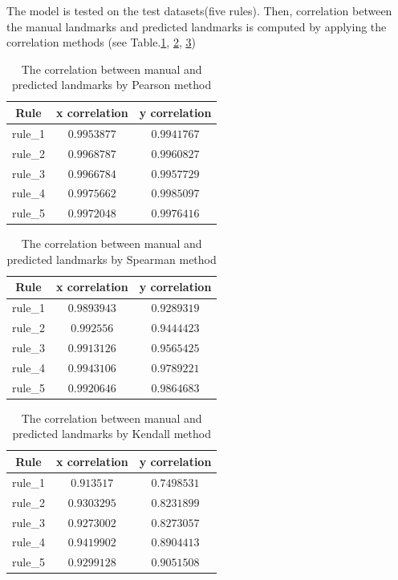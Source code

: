 The model is tested on the test datasets(five rules). Then, correlation between the manual landmarks and predicted landmarks is computed by applying the correlation methods (see Table.\ref{pearson}, \ref{spearman}, \ref{kendall})
\begin{table}[h!]
	\centering
	\begin{tabular}{c c c}
		Rule & x correlation & y correlation \\ \hline
		rule\_1 & $0.9953877$ & $0.9941767$ \\ \hline
		rule\_2 & $0.9968787$ & $0.9960827$ \\ \hline
		rule\_3 & $0.9966784$ & $0.9957729$ \\ \hline
		rule\_4 & $0.9975662$ & $0.9985097$ \\ \hline
		rule\_5 & $0.9972048$ & $0.9976416$ \\ \hline
	\end{tabular}
	\caption{The correlation between manual and predicted landmarks by Pearson\cite{pallant2013spss} method}
	\label{pearson}
\end{table}
\begin{table}[h!]
	\centering
	\begin{tabular}{c c c}
		Rule & x correlation & y correlation \\ \hline
		rule\_1 & $0.9893943$ & $0.9289319$ \\ \hline
		rule\_2 & $0.992556$ & $0.9444423$ \\ \hline
		rule\_3 & $0.9913126$ & $0.9565425$ \\ \hline
		rule\_4 & $0.9943106$ & $0.9789221$ \\ \hline
		rule\_5 & $0.9920646$ & $0.9864683$ \\ \hline
	\end{tabular}
	\caption{The correlation between manual and predicted landmarks by Spearman\cite{myers2010research} method}
	\label{spearman}
\end{table}
\begin{table}[h!]
	\centering
	\begin{tabular}{c c c}
		Rule & x correlation & y correlation \\ \hline
		rule\_1 & $0.913517$ & $0.7498531$ \\ \hline
		rule\_2 & $0.9303295$ & $0.8231899$ \\ \hline
		rule\_3 & $0.9273002$ & $0.8273057$ \\ \hline
		rule\_4 & $0.9419902$ & $0.8904413$ \\ \hline
		rule\_5 & $0.9299128$ & $0.9051508$ \\ \hline
	\end{tabular}
	\caption{The correlation between manual and predicted landmarks by Kendall\cite{kendall1938new} method}
	\label{kendall}
\end{table}

